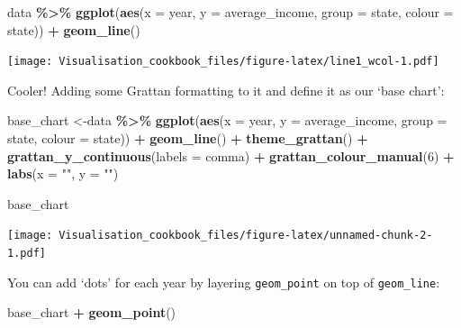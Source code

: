 \documentclass[
]{book}
\newenvironment{Shaded}{\begin{snugshade}}{\end{snugshade}}
\newcommand{\DataTypeTok}[1]{\textcolor[rgb]{0.13,0.29,0.53}{#1}}
\newcommand{\DecValTok}[1]{\textcolor[rgb]{0.00,0.00,0.81}{#1}}
\newcommand{\KeywordTok}[1]{\textcolor[rgb]{0.13,0.29,0.53}{\textbf{#1}}}
\newcommand{\NormalTok}[1]{#1}
\newcommand{\OperatorTok}[1]{\textcolor[rgb]{0.81,0.36,0.00}{\textbf{#1}}}
\newcommand{\StringTok}[1]{\textcolor[rgb]{0.31,0.60,0.02}{#1}}
\begin{document}
\begin{Shaded}
\begin{Highlighting}[]
\NormalTok{data }\OperatorTok{\%\textgreater{}\%}\StringTok{ }
\StringTok{  }\KeywordTok{ggplot}\NormalTok{(}\KeywordTok{aes}\NormalTok{(}\DataTypeTok{x =}\NormalTok{ year,}
             \DataTypeTok{y =}\NormalTok{ average\_income,}
             \DataTypeTok{group =}\NormalTok{ state,}
             \DataTypeTok{colour =}\NormalTok{ state)) }\OperatorTok{+}\StringTok{ }
\StringTok{  }\KeywordTok{geom\_line}\NormalTok{()}
\end{Highlighting}
\end{Shaded}

\texttt{[image: Visualisation\_cookbook\_files/figure-latex/line1\_wcol-1.pdf]}

Cooler! Adding some Grattan formatting to it and define it as our `base chart':

\begin{Shaded}
\begin{Highlighting}[]
\NormalTok{base\_chart \textless{}{-}data }\OperatorTok{\%\textgreater{}\%}\StringTok{ }
\StringTok{  }\KeywordTok{ggplot}\NormalTok{(}\KeywordTok{aes}\NormalTok{(}\DataTypeTok{x =}\NormalTok{ year,}
             \DataTypeTok{y =}\NormalTok{ average\_income,}
             \DataTypeTok{group =}\NormalTok{ state,}
             \DataTypeTok{colour =}\NormalTok{ state)) }\OperatorTok{+}\StringTok{ }
\StringTok{  }\KeywordTok{geom\_line}\NormalTok{() }\OperatorTok{+}
\StringTok{  }\KeywordTok{theme\_grattan}\NormalTok{() }\OperatorTok{+}\StringTok{ }
\StringTok{  }\KeywordTok{grattan\_y\_continuous}\NormalTok{(}\DataTypeTok{labels =}\NormalTok{ comma) }\OperatorTok{+}\StringTok{ }
\StringTok{  }\KeywordTok{grattan\_colour\_manual}\NormalTok{(}\DecValTok{6}\NormalTok{) }\OperatorTok{+}
\StringTok{  }\KeywordTok{labs}\NormalTok{(}\DataTypeTok{x =} \StringTok{""}\NormalTok{,}
       \DataTypeTok{y =} \StringTok{""}\NormalTok{)}

\NormalTok{base\_chart}
\end{Highlighting}
\end{Shaded}

\texttt{[image: Visualisation\_cookbook\_files/figure-latex/unnamed-chunk-2-1.pdf]}

You can add `dots' for each year by layering \texttt{geom\_point} on top of \texttt{geom\_line}:

\begin{Shaded}
\begin{Highlighting}[]
\NormalTok{base\_chart }\OperatorTok{+}
\StringTok{  }\KeywordTok{geom\_point}\NormalTok{()}
\end{Highlighting}
\end{Shaded}
\end{document}
